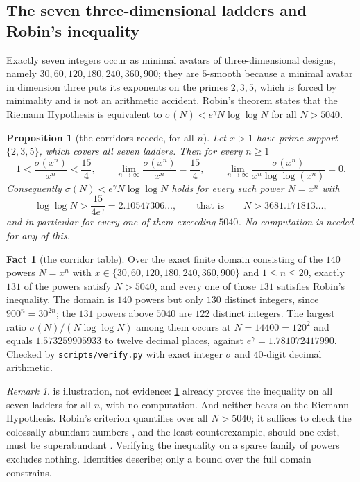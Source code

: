 \documentclass[11pt]{amsart}
\newtheorem{proposition}[theorem]{Proposition}
\theoremstyle{definition}
\newtheorem{fact}[theorem]{Fact}
\theoremstyle{remark}
\newtheorem{remark}[theorem]{Remark}
\begin{document}
\subsection*{The seven three-dimensional ladders and Robin's inequality}

Exactly seven integers occur as minimal avatars of three-dimensional designs, namely $30, 60, 120, 180, 240, 360, 900$; they are $5$-smooth because a minimal avatar in dimension three puts its exponents on the primes $2,3,5$, which is forced by minimality and is not an arithmetic accident. Robin's theorem \cite{robin} states that the Riemann Hypothesis is equivalent to $\sigma(N) < e^{\gamma}N\log\log N$ for all $N > 5040$.

\begin{proposition}[the corridors recede, for all $n$]
\label{prop:robin}
Let $x>1$ have prime support $\{2,3,5\}$, which covers all seven ladders. Then for every $n \ge 1$
\[
  1 < \frac{\sigma(x^{n})}{x^{n}} < \frac{15}{4},
  \qquad
  \lim_{n \to \infty}\frac{\sigma(x^{n})}{x^{n}} = \frac{15}{4},
  \qquad
  \lim_{n \to \infty}\frac{\sigma(x^{n})}{x^{n}\log\log(x^{n})} = 0 .
\]
Consequently $\sigma(N) < e^{\gamma}N\log\log N$ holds for every such power $N = x^{n}$ with
\[
  \log\log N > \frac{15}{4e^{\gamma}} = 2.10547306\ldots,
  \qquad \text{that is} \qquad N > 3681.171813\ldots,
\]
and in particular for every one of them exceeding $5040$. No computation is needed for any of this.
\end{proposition}

\begin{fact}[the corridor table]
\label{fact:robin}
Over the exact finite domain consisting of the $140$ powers $N = x^{n}$ with $x \in \{30,60,120,180,240,360,900\}$ and $1 \le n \le 20$, exactly $131$ of the powers satisfy $N > 5040$, and every one of those $131$ satisfies Robin's inequality. The domain is $140$ powers but only $130$ distinct integers, since $900^{n} = 30^{2n}$; the $131$ powers above $5040$ are $122$ distinct integers. The largest ratio $\sigma(N)/(N\log\log N)$ among them occurs at $N = 14400 = 120^{2}$ and equals $1.573259905933$ to twelve decimal places, against $e^{\gamma} = 1.781072417990$. Checked by \texttt{scripts/verify.py} with exact integer $\sigma$ and $40$-digit decimal arithmetic.
\end{fact}

\begin{remark}
\label{rem:norh}
 is illustration, not evidence: \cref{prop:robin} already proves the inequality on all seven ladders for all $n$, with no computation. And neither bears on the Riemann Hypothesis. Robin's criterion quantifies over all $N > 5040$; it suffices to check the colossally abundant numbers \cite{robin}, and the least counterexample, should one exist, must be superabundant \cite{akbaryfriggstad}. Verifying the inequality on a sparse family of powers excludes nothing. Identities describe; only a bound over the full domain constrains.
\end{remark}
\end{document}

